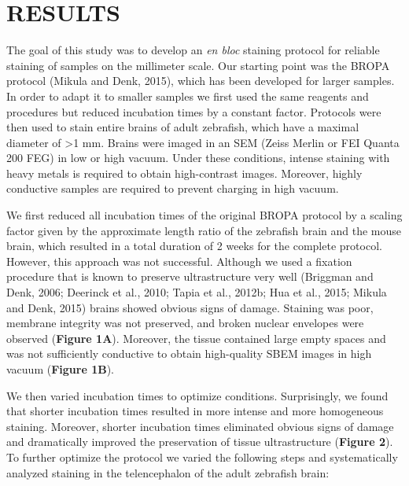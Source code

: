 \documentclass{article}
\begin{document}
\section*{RESULTS}

The goal of this study was to develop an \emph{en bloc} staining protocol for reliable staining of samples on the millimeter scale. Our starting point was the BROPA protocol (Mikula and Denk, 2015), which has been developed for larger samples. In order to adapt it to smaller samples we first used the same reagents and procedures but reduced incubation times by a constant factor. Protocols were then used to stain entire brains of adult zebrafish, which have a maximal diameter of >1 mm. Brains were imaged in an SEM (Zeiss Merlin or FEI Quanta 200 FEG) in low or high vacuum. Under these conditions, intense staining with heavy metals is required to obtain high-contrast images. Moreover, highly conductive samples are required to prevent charging in high vacuum.

We first reduced all incubation times of the original BROPA protocol by a scaling factor given by the approximate length ratio of the zebrafish brain and the mouse brain, which resulted in a total duration of 2 weeks for the complete protocol. However, this approach was not successful. Although we used a fixation procedure that is known to preserve ultrastructure very well (Briggman and Denk, 2006; Deerinck et al., 2010; Tapia et al., 2012b; Hua et al., 2015; Mikula and Denk, 2015) brains showed obvious signs of damage. Staining was poor, membrane integrity was not preserved, and broken nuclear envelopes were observed (\textbf{Figure 1A}). Moreover, the tissue contained large empty spaces and was not sufficiently conductive to obtain high-quality SBEM images in high vacuum (\textbf{Figure 1B}).

We then varied incubation times to optimize conditions. Surprisingly, we found that shorter incubation times resulted in more intense and more homogeneous staining. Moreover, shorter incubation times eliminated obvious signs of damage and dramatically improved the preservation of tissue ultrastructure (\textbf{Figure 2}). To further optimize the protocol we varied the following steps and systematically analyzed staining in the telencephalon of the adult zebrafish brain:
\end{document}
